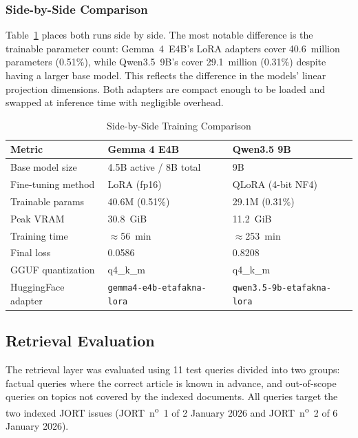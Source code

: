 \subsubsection{Side-by-Side Comparison}
\label{subsubsec:ch4-training-comparison}

Table~\ref{tab:training-comparison} places both runs side by side. The most notable difference is the trainable parameter count: Gemma~4~E4B's LoRA adapters cover 40.6~million parameters (0.51\%), while Qwen3.5~9B's cover 29.1~million (0.31\%) despite having a larger base model. This reflects the difference in the models' linear projection dimensions. Both adapters are compact enough to be loaded and swapped at inference time with negligible overhead.

\begin{table}[H]
\centering
\caption{Side-by-Side Training Comparison}
\label{tab:training-comparison}
\renewcommand{\arraystretch}{1.3}
\begin{tabular}{|p{4cm}|p{5.5cm}|p{5.5cm}|}
\hline
\textbf{Metric} & \textbf{Gemma 4 E4B} & \textbf{Qwen3.5 9B} \\
\hline
Base model size & 4.5B active / 8B total & 9B \\
\hline
Fine-tuning method & LoRA (fp16) & QLoRA (4-bit NF4) \\
\hline
Trainable params & 40.6M (0.51\%) & 29.1M (0.31\%) \\
\hline
Peak VRAM & 30.8~GiB & 11.2~GiB \\
\hline
Training time & $\approx$56~min & $\approx$253~min \\
\hline
Final loss & 0.0586 & 0.8208 \\
\hline
GGUF quantization & q4\_k\_m & q4\_k\_m \\
\hline
HuggingFace adapter & \texttt{gemma4-e4b-etafakna-lora} & \texttt{qwen3.5-9b-etafakna-lora} \\
\hline
\end{tabular}
\end{table}

\subsection{Retrieval Evaluation}
\label{subsec:ch4-retrieval-eval}

The retrieval layer was evaluated using 11 test queries divided into two groups: factual queries where the correct article is known in advance, and out-of-scope queries on topics not covered by the indexed documents. All queries target the two indexed \ac{JORT} issues (JORT~n\textsuperscript{o}~1 of 2 January 2026 and JORT~n\textsuperscript{o}~2 of 6 January 2026).

